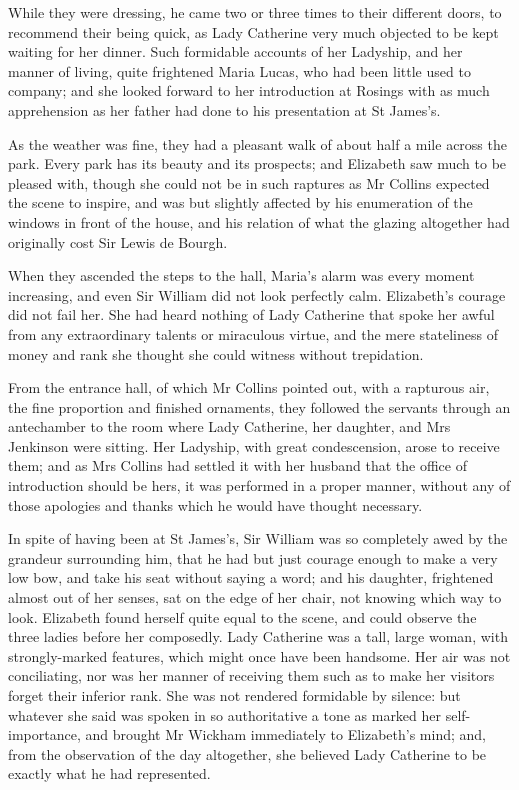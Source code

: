 While they were dressing, he came two or three times to their different doors, to recommend their being quick, as Lady Catherine very much objected to be kept waiting for her dinner. Such formidable accounts of her Ladyship, and her manner of living, quite frightened Maria Lucas, who had been little used to company; and she looked forward to her introduction at Rosings with as much apprehension as her father had done to his presentation at St James's.

As the weather was fine, they had a pleasant walk of about half a mile across the park. Every park has its beauty and its prospects; and Elizabeth saw much to be pleased with, though she could not be in such raptures as Mr Collins expected the scene to inspire, and was but slightly affected by his enumeration of the windows in front of the house, and his relation of what the glazing altogether had originally cost Sir Lewis de Bourgh.

When they ascended the steps to the hall, Maria's alarm was every moment increasing, and even Sir William did not look perfectly calm. Elizabeth's courage did not fail her. She had heard nothing of Lady Catherine that spoke her awful from any extraordinary talents or miraculous virtue, and the mere stateliness of money and rank she thought she could witness without trepidation.

From the entrance hall, of which Mr Collins pointed out, with a rapturous air, the fine proportion and finished ornaments, they followed the servants through an antechamber to the room where Lady Catherine, her daughter, and Mrs Jenkinson were sitting. Her Ladyship, with great condescension, arose to receive them; and as Mrs Collins had settled it with her husband that the office of introduction should be hers, it was performed in a proper manner, without any of those apologies and thanks which he would have thought necessary.

In spite of having been at St James's, Sir William was so completely awed by the grandeur surrounding him, that he had but just courage enough to make a very low bow, and take his seat without saying a word; and his daughter, frightened almost out of her senses, sat on the edge of her chair, not knowing which way to look. Elizabeth found herself quite equal to the scene, and could observe the three ladies before her composedly. Lady Catherine was a tall, large woman, with strongly-marked features, which might once have been handsome. Her air was not conciliating, nor was her manner of receiving them such as to make her visitors forget their inferior rank. She was not rendered formidable by silence: but whatever she said was spoken in so authoritative a tone as marked her self-importance, and brought Mr Wickham immediately to Elizabeth's mind; and, from the observation of the day altogether, she believed Lady Catherine to be exactly what he had represented.

